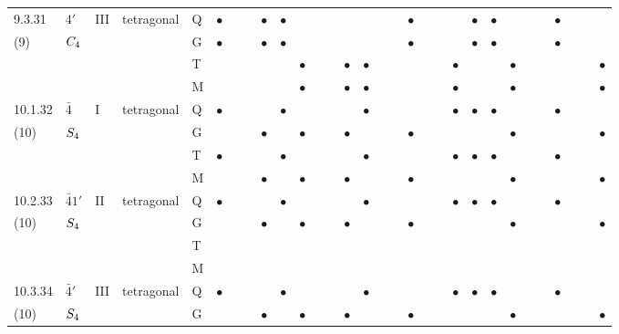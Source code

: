 \documentclass[fleqn,9pt,landscape]{jsarticle}
\begin{document}
\begin{longtable}{lllll|l|lll|ll|lll|l|lll|lll|l|ll|lll|lll}
9.3.31 & \texttt{$4'$} & III & tetragonal & Q & $\bullet$ &  &  & $\bullet$ & $\bullet$ &  &  &  &  &  &  &  & $\bullet$ &  &  &  & $\bullet$ & $\bullet$ &  &  &  & $\bullet$ &  &  &  \\
(9) & $C_{\rm 4}$ &  &  & G & $\bullet$ &  &  & $\bullet$ & $\bullet$ &  &  &  &  &  &  &  & $\bullet$ &  &  &  & $\bullet$ & $\bullet$ &  &  &  & $\bullet$ &  &  &  \\
 &  &  &  & T &  &  &  &  &  & $\bullet$ &  &  & $\bullet$ & $\bullet$ &  &  &  &  &  & $\bullet$ &  &  & $\bullet$ &  &  &  &  &  & $\bullet$ \\
 &  &  &  & M &  &  &  &  &  & $\bullet$ &  &  & $\bullet$ & $\bullet$ &  &  &  &  &  & $\bullet$ &  &  & $\bullet$ &  &  &  &  &  & $\bullet$ \\ \hline
10.1.32 & \texttt{$\bar{4}$} & I & tetragonal & Q & $\bullet$ &  &  &  & $\bullet$ &  &  &  &  & $\bullet$ &  &  &  &  &  & $\bullet$ & $\bullet$ & $\bullet$ &  &  &  & $\bullet$ &  &  &  \\
(10) & $S_{\rm 4}$ &  &  & G &  &  &  & $\bullet$ &  & $\bullet$ &  &  & $\bullet$ &  &  &  & $\bullet$ &  &  &  &  &  & $\bullet$ &  &  &  &  &  & $\bullet$ \\
 &  &  &  & T & $\bullet$ &  &  &  & $\bullet$ &  &  &  &  & $\bullet$ &  &  &  &  &  & $\bullet$ & $\bullet$ & $\bullet$ &  &  &  & $\bullet$ &  &  &  \\
 &  &  &  & M &  &  &  & $\bullet$ &  & $\bullet$ &  &  & $\bullet$ &  &  &  & $\bullet$ &  &  &  &  &  & $\bullet$ &  &  &  &  &  & $\bullet$ \\ \hline
10.2.33 & \texttt{$\bar{4}1'$} & II & tetragonal & Q & $\bullet$ &  &  &  & $\bullet$ &  &  &  &  & $\bullet$ &  &  &  &  &  & $\bullet$ & $\bullet$ & $\bullet$ &  &  &  & $\bullet$ &  &  &  \\
(10) & $S_{\rm 4}$ &  &  & G &  &  &  & $\bullet$ &  & $\bullet$ &  &  & $\bullet$ &  &  &  & $\bullet$ &  &  &  &  &  & $\bullet$ &  &  &  &  &  & $\bullet$ \\
 &  &  &  & T &  &  &  &  &  &  &  &  &  &  &  &  &  &  &  &  &  &  &  &  &  &  &  &  &  \\
 &  &  &  & M &  &  &  &  &  &  &  &  &  &  &  &  &  &  &  &  &  &  &  &  &  &  &  &  &  \\ \hline
10.3.34 & \texttt{$\bar{4}'$} & III & tetragonal & Q & $\bullet$ &  &  &  & $\bullet$ &  &  &  &  & $\bullet$ &  &  &  &  &  & $\bullet$ & $\bullet$ & $\bullet$ &  &  &  & $\bullet$ &  &  &  \\
(10) & $S_{\rm 4}$ &  &  & G &  &  &  & $\bullet$ &  & $\bullet$ &  &  & $\bullet$ &  &  &  & $\bullet$ &  &  &  &  &  & $\bullet$ &  &  &  &  &  & $\bullet$ \\

\end{longtable}
\end{document}
